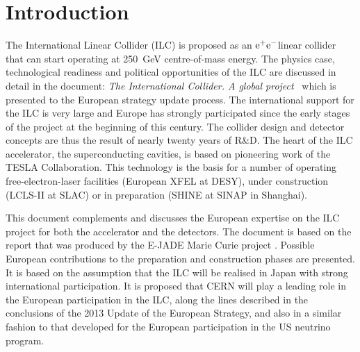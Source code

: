 \documentclass[%
 reprint,
 floatfix,
 amsmath,amssymb,
 aps,
]{revtex4-1}
\newcommand{\epem}{\mbox{${\rm e}^+{\rm e}^-$}}
\begin{document}
\pagebreak

\pagestyle{plain}
\setcounter{page}{1}

\twocolumngrid

\section{\label{sec:intro}Introduction}

The International Linear Collider (ILC) is proposed as an \epem linear collider that can start operating at  250~GeV centre-of-mass energy. The physics case, technological readiness and political opportunities of the ILC are discussed in detail in the document: \emph{The International Collider. A global project}~\cite{ILCESU1} which is presented to the European strategy update process. The international  support for the ILC is very large and Europe has strongly participated since the early stages of the project at the beginning of this century.   The collider design and detector concepts are thus the result of nearly twenty years of R\&D. The heart of the ILC accelerator, the superconducting cavities, is based on pioneering work of the TESLA Collaboration. This technology is the basis for a number of operating free-electron-laser facilities (European XFEL at DESY), under construction (LCLS-II at SLAC) or in preparation (SHINE at SINAP in Shanghai).

This document complements \cite{ILCforESS} and discusses the European expertise on the ILC project for both the accelerator and the detectors. The document is based on the report \cite{ejade-report} that was produced by the E-JADE Marie Curie project \cite{ejade}. Possible European contributions to the preparation and construction phases are presented. It is based on the assumption that the ILC will be realised in Japan with strong international participation. 
It is proposed that CERN will play a leading role in the European participation in the ILC, along the lines described in the  conclusions of the 2013 Update of the European Strategy, and also in a similar fashion to that  developed for the European participation in the US neutrino program.  
\end{document}
